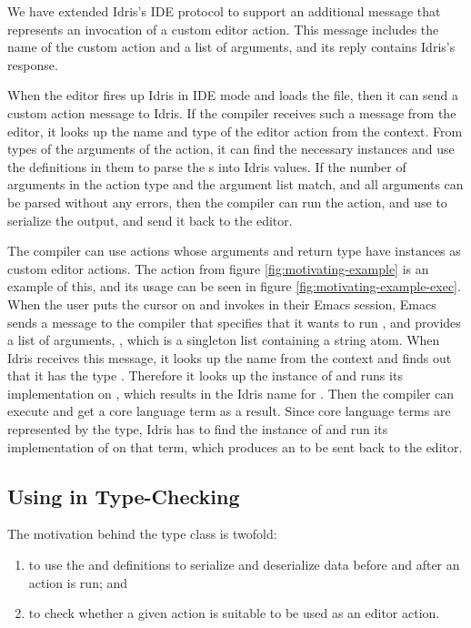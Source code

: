 We have extended Idris's IDE protocol to support an additional message that
represents an invocation of a custom editor action.
This message includes the name of the custom action and a list of arguments,
and its reply contains Idris's response.

When the editor fires up Idris in IDE mode and loads the file, then it can send
a custom action message to Idris. If the compiler receives such a message from
the editor, it looks up the name and type of the editor action from the
context. From types of the arguments of the \Elab{} action, it can find the
necessary \Editorable{} instances and use the  definitions in them
to parse the \sexp{}s into Idris values. If the number of arguments in the
action type and the argument list match, and all arguments can be parsed
without any errors, then the compiler can run the \Elab{} action, and use
 to serialize the output, and send it back to the editor.

The compiler can use \Elab{} actions whose arguments and return type have
\Editorable{} instances as custom editor actions. The  action from
figure \ref{fig:motivating-example} is an example of this, and its usage can be
seen in figure \ref{fig:motivating-example-exec}.
When the user puts the cursor on  and invokes
 in their Emacs session, Emacs sends a message to the compiler
that specifies that it wants to run , and provides a list of
arguments, , which is a singleton list
containing a string atom. When Idris receives this message, it looks up the
name  from the context and finds out that it has the type
. Therefore it looks up the \Editorable{}
instance of  and runs its  implementation on , which
results in the Idris name for . Then the compiler can execute
 and get a core language term \dt{()} as a result. Since core
language terms are represented by the \TT{} type, Idris has to find the
\Editorable{} instance of \TT{} and run its implementation of  on that term,
which produces an \sexp{} to be sent back to the editor.

\subsection{Using \Editorable{} in Type-Checking}
\label{ssec:typechecking}

The motivation behind the  type class is twofold:
\begin{enumerate}
\item to use the  and  definitions to serialize
  and deserialize data before and after an \Elab{} action is run; and
\item to check whether a given \Elab{} action is suitable to be used as an
  editor action.
\end{enumerate}

